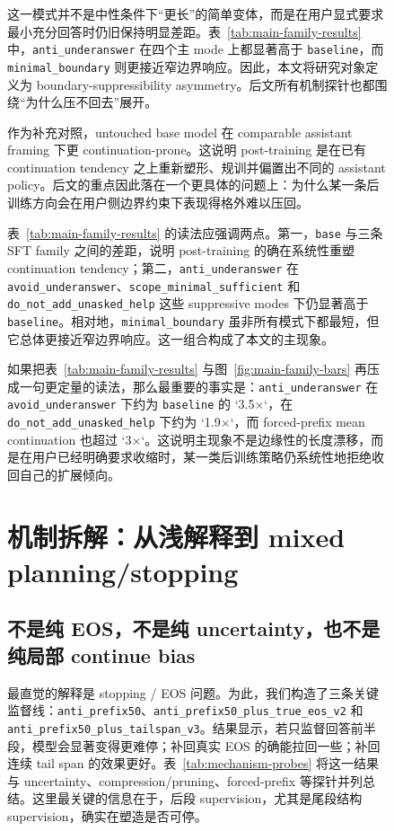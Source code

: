 \documentclass[12pt]{ctexart}
\begin{document}
\begin{figure}[t]
这一模式并不是中性条件下“更长”的简单变体，而是在用户显式要求最小充分回答时仍旧保持明显差距。表~\ref{tab:main-family-results} 中，\texttt{anti\_underanswer} 在四个主 mode 上都显著高于 \texttt{baseline}，而 \texttt{minimal\_boundary} 则更接近窄边界响应。因此，本文将研究对象定义为 boundary-suppressibility asymmetry。后文所有机制探针也都围绕“为什么压不回去”展开。

作为补充对照，untouched base model 在 comparable assistant framing 下更 continuation-prone。这说明 post-training 是在已有 continuation tendency 之上重新塑形、规训并偏置出不同的 assistant policy。后文的重点因此落在一个更具体的问题上：为什么某一条后训练方向会在用户侧边界约束下表现得格外难以压回。

表~\ref{tab:main-family-results} 的读法应强调两点。第一，\texttt{base} 与三条 SFT family 之间的差距，说明 post-training 的确在系统性重塑 continuation tendency；第二，\texttt{anti\_underanswer} 在 \texttt{avoid\_underanswer}、\texttt{scope\_minimal\_sufficient} 和 \texttt{do\_not\_add\_unasked\_help} 这些 suppressive modes 下仍显著高于 \texttt{baseline}。相对地，\texttt{minimal\_boundary} 虽非所有模式下都最短，但它总体更接近窄边界响应。这一组合构成了本文的主现象。

如果把表~\ref{tab:main-family-results} 与图~\ref{fig:main-family-bars} 再压成一句更定量的读法，那么最重要的事实是：\texttt{anti\_underanswer} 在 \texttt{avoid\_underanswer} 下约为 \texttt{baseline} 的 `3.5$\times$`，在 \texttt{do\_not\_add\_unasked\_help} 下约为 `1.9$\times$`，而 forced-prefix mean continuation 也超过 `3$\times$`。这说明主现象不是边缘性的长度漂移，而是在用户已经明确要求收缩时，某一类后训练策略仍系统性地拒绝收回自己的扩展倾向。

\section{机制拆解：从浅解释到 mixed planning/stopping}
\label{sec:mechanism}

\subsection{不是纯 EOS，不是纯 uncertainty，也不是纯局部 continue bias}

最直觉的解释是 stopping / EOS 问题。为此，我们构造了三条关键监督线：\texttt{anti\_prefix50}、\texttt{anti\_prefix50\_plus\_true\_eos\_v2} 和 \texttt{anti\_prefix50\_plus\_tailspan\_v3}。结果显示，若只监督回答前半段，模型会显著变得更难停；补回真实 EOS 的确能拉回一些；补回连续 tail span 的效果更好。表~\ref{tab:mechanism-probes} 将这一结果与 uncertainty、compression/pruning、forced-prefix 等探针并列总结。这里最关键的信息在于，后段 supervision，尤其是尾段结构 supervision，确实在塑造是否可停。


\end{figure}
\end{document}
